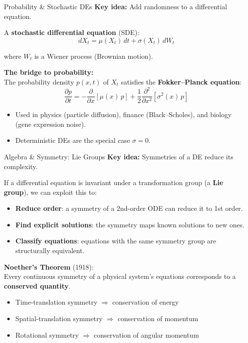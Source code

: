 
\begin{frame}{Probability \& Stochastic DEs}
\textbf{Key idea:} Add randomness to a differential equation.

\vspace{0.3cm}
A \textbf{stochastic differential equation} (SDE):
\[
dX_t = \mu(X_t)\,dt + \sigma(X_t)\,dW_t
\]

where $W_t$ is a Wiener process (Brownian motion).

\vspace{0.3cm}
\textbf{The bridge to probability:} \\
The probability density $p(x,t)$ of $X_t$ satisfies the \textbf{Fokker--Planck equation}:
\[
\frac{\partial p}{\partial t} = -\frac{\partial}{\partial x}[\mu(x)\, p] + \frac{1}{2}\frac{\partial^2}{\partial x^2}[\sigma^2(x)\, p]
\]

\vspace{0.2cm}
\begin{itemize}
    \item Used in physics (particle diffusion), finance (Black--Scholes), and biology (gene expression noise).
    \item Deterministic DEs are the special case $\sigma = 0$.
\end{itemize}
\end{frame}


\begin{frame}{Algebra \& Symmetry: Lie Groups}
\textbf{Key idea:} Symmetries of a DE reduce its complexity.

\vspace{0.3cm}
If a differential equation is invariant under a transformation group (a \textbf{Lie group}), we can exploit this to:

\begin{itemize}
    \item \textbf{Reduce order}: a symmetry of a 2nd-order ODE can reduce it to 1st order.
    \item \textbf{Find explicit solutions}: the symmetry maps known solutions to new ones.
    \item \textbf{Classify equations}: equations with the same symmetry group are structurally equivalent.
\end{itemize}

\vspace{0.3cm}
\textbf{Noether's Theorem} (1918): \\
Every continuous symmetry of a physical system's equations corresponds to a \textbf{conserved quantity}.

\begin{itemize}
    \item Time-translation symmetry $\Rightarrow$ conservation of energy
    \item Spatial-translation symmetry $\Rightarrow$ conservation of momentum
    \item Rotational symmetry $\Rightarrow$ conservation of angular momentum
\end{itemize}
\end{frame}



